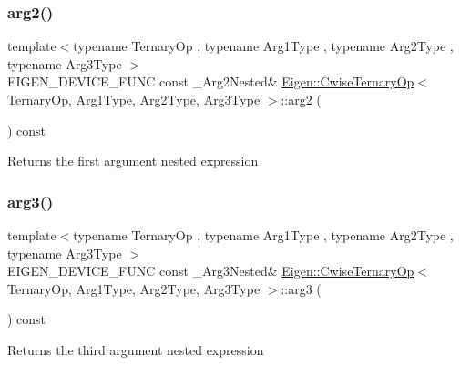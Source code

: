 \subsubsection{\texorpdfstring{arg2()}{arg2()}}
{\footnotesize\ttfamily template$<$typename Ternary\+Op , typename Arg1\+Type , typename Arg2\+Type , typename Arg3\+Type $>$ \\
E\+I\+G\+E\+N\+\_\+\+D\+E\+V\+I\+C\+E\+\_\+\+F\+U\+NC const \+\_\+\+Arg2\+Nested\& \mbox{\hyperlink{class_eigen_1_1_cwise_ternary_op}{Eigen\+::\+Cwise\+Ternary\+Op}}$<$ Ternary\+Op, Arg1\+Type, Arg2\+Type, Arg3\+Type $>$\+::arg2 (\begin{DoxyParamCaption}{ }\end{DoxyParamCaption}) const\hspace{0.3cm}{\ttfamily [inline]}}

\begin{DoxyReturn}{Returns}
the first argument nested expression 
\end{DoxyReturn}
\mbox{\label{class_eigen_1_1_cwise_ternary_op_aab71f401afd7ebc25428369c30151a1f}} 
\subsubsection{\texorpdfstring{arg3()}{arg3()}}
{\footnotesize\ttfamily template$<$typename Ternary\+Op , typename Arg1\+Type , typename Arg2\+Type , typename Arg3\+Type $>$ \\
E\+I\+G\+E\+N\+\_\+\+D\+E\+V\+I\+C\+E\+\_\+\+F\+U\+NC const \+\_\+\+Arg3\+Nested\& \mbox{\hyperlink{class_eigen_1_1_cwise_ternary_op}{Eigen\+::\+Cwise\+Ternary\+Op}}$<$ Ternary\+Op, Arg1\+Type, Arg2\+Type, Arg3\+Type $>$\+::arg3 (\begin{DoxyParamCaption}{ }\end{DoxyParamCaption}) const\hspace{0.3cm}{\ttfamily [inline]}}

\begin{DoxyReturn}{Returns}
the third argument nested expression 
\end{DoxyReturn}
\mbox{\label{class_eigen_1_1_cwise_ternary_op_acec526305dd83e6c0b3bd2cdbfd19307}} 
